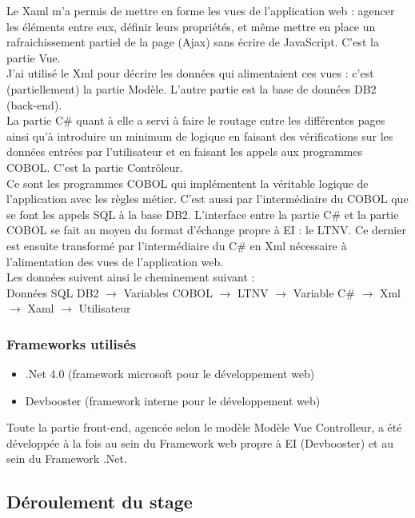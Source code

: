 \documentclass[a4paper,french,12pt]{article}
\begin{document}
			Le Xaml m’a permis de mettre en forme les vues de l’application web : agencer les éléments entre eux, définir leurs propriétés,
			et même mettre en place un rafraichissement partiel de la page (Ajax) sans écrire de JavaScript. C’est la partie Vue.\\
			J’ai utilisé le Xml pour décrire les données qui alimentaient ces vues : c’est (partiellement) la partie Modèle. L’autre partie est la base de données DB2 (back-end).\\
			La partie C\# quant à elle a servi à faire le routage entre les différentes pages ainsi qu’à introduire un minimum de logique en faisant des vérifications sur les données entrées par l'utilisateur 
			et en faisant les appels aux programmes COBOL. C’est la partie Contrôleur.\\ 
						
			Ce sont les programmes COBOL qui implémentent la véritable logique de l’application avec les règles métier.
			C’est aussi par l’intermédiaire du COBOL que se font les appels SQL à la base DB2.
			L’interface entre la partie C\# et la partie COBOL se fait au moyen du format d’échange propre à EI : le LTNV. 
			Ce dernier est ensuite transformé par l’intermédiaire du C\# en Xml nécessaire à l’alimentation des vues de l’application web.\\ 
			
			Les données suivent ainsi le cheminement suivant : \\

			 Données SQL DB2 $\to$ Variables COBOL $\to$ LTNV $\to$ Variable C\# $\to$ Xml $\to$ Xaml $\to$ Utilisateur 


	
		\subsubsection{Frameworks utilisés}
		
			\begin{itemize}
				\item .Net 4.0 (framework microsoft pour le développement web)
				\item Devbooster (framework interne pour le développement web)
			\end{itemize}
			
			Toute la partie front-end, agencée selon le modèle Modèle Vue Controlleur, a été développée à la fois au sein du Framework  web propre à EI (Devbooster) et au sein du Framework .Net.
		
		
	\subsection{Déroulement du stage}
	
\end{document}
